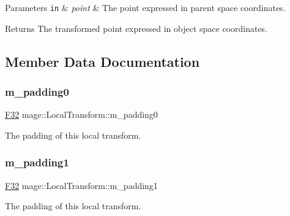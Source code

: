 \begin{DoxyParams}[1]{Parameters}
\mbox{\tt in}  & {\em point} & The point expressed in parent space coordinates. \\
\hline
\end{DoxyParams}
\begin{DoxyReturn}{Returns}
The transformed point expressed in object space coordinates. 
\end{DoxyReturn}


\subsection{Member Data Documentation}
\mbox{\label{classmage_1_1_local_transform_a408d86574aca8976ca123b992118c6f8}} 
\subsubsection{\texorpdfstring{m\+\_\+padding0}{m\_padding0}}
{\footnotesize\ttfamily \mbox{\hyperlink{namespacemage_aa97e833b45f06d60a0a9c4fc22ae02c0}{F32}} mage\+::\+Local\+Transform\+::m\+\_\+padding0\hspace{0.3cm}{\ttfamily [private]}}

The padding of this local transform. \mbox{\label{classmage_1_1_local_transform_a3b2b212788e819fb6ac46322c15e002e}} 
\subsubsection{\texorpdfstring{m\+\_\+padding1}{m\_padding1}}
{\footnotesize\ttfamily \mbox{\hyperlink{namespacemage_aa97e833b45f06d60a0a9c4fc22ae02c0}{F32}} mage\+::\+Local\+Transform\+::m\+\_\+padding1\hspace{0.3cm}{\ttfamily [private]}}

The padding of this local transform. \mbox{\label{classmage_1_1_local_transform_ad293dda4a1c7bfec90267915937aec90}} 
